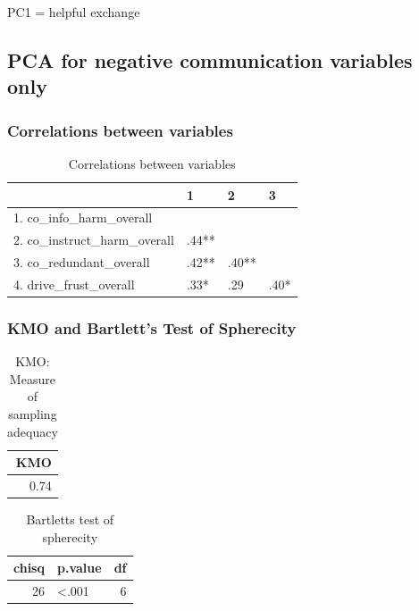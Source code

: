 \documentclass[]{article}
\begin{document}
PC1 = helpful exchange

\newpage

\hypertarget{pca-for-negative-communication-variables-only}{%
\subsection{PCA for negative communication variables
only}\label{pca-for-negative-communication-variables-only}}

\hypertarget{correlations-between-variables-2}{%
\subsubsection{Correlations between
variables}\label{correlations-between-variables-2}}

\begin{table}[H]

\caption{\label{tab:unnamed-chunk-12}Correlations between variables}
\centering
\fontsize{6}{8}\selectfont
\begin{tabular}[t]{llll}
\toprule
  & 1 & 2 & 3\\
\midrule
1. co\_info\_harm\_overall &  &  & \\
2. co\_instruct\_harm\_overall & .44** &  & \\
3. co\_redundant\_overall & .42** & .40** & \\
4. drive\_frust\_overall & .33* & .29 & .40*\\
\bottomrule
\end{tabular}
\end{table}

\hypertarget{kmo-and-bartletts-test-of-spherecity-2}{%
\subsubsection{KMO and Bartlett's Test of
Spherecity}\label{kmo-and-bartletts-test-of-spherecity-2}}

\begin{table}[H]

\caption{\label{tab:unnamed-chunk-13}KMO: Measure of sampling adequacy}
\centering
\fontsize{6}{8}\selectfont
\begin{tabular}[t]{r}
\toprule
KMO\\
\midrule
0.74\\
\bottomrule
\end{tabular}
\end{table}

\begin{table}[H]

\caption{\label{tab:unnamed-chunk-13}Bartletts test of spherecity}
\centering
\fontsize{6}{8}\selectfont
\begin{tabular}[t]{rlr}
\toprule
chisq & p.value & df\\
\midrule
26 & <.001 & 6\\
\bottomrule
\end{tabular}
\end{table}
\end{document}
